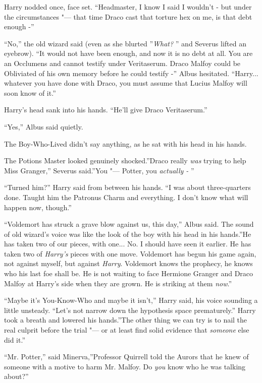 Harry nodded once, face set. ``Headmaster, I know I said I wouldn't -
but under the circumstances "--- that time Draco cast that torture hex on
me, is that debt enough -''

``No,'' the old wizard said (even as she blurted ''\emph{What?} '' and
Severus lifted an eyebrow). ``It would not have been enough, and now it
is no debt at all. You are an Occlumens and cannot testify under
Veritaserum. Draco Malfoy could be Obliviated of his own memory before
he could testify -'' Albus hesitated. ``Harry... whatever you have
done with Draco, you must assume that Lucius Malfoy will soon know of
it.''

Harry's head sank into his hands. ``He'll give Draco Veritaserum.''

``Yes,'' Albus said quietly.

The Boy-Who-Lived didn't say anything, as he sat with his head in his
hands.

The Potions Master looked genuinely shocked.''Draco really \emph{was}
trying to help Miss Granger,'' Severus said.''You "--- Potter, you
\emph{actually -} ''

``Turned him?'' Harry said from between his hands. ``I was about
three-quarters done. Taught him the Patronus Charm and everything. I
don't know what will happen now, though.''

``Voldemort has struck a grave blow against us, this day,'' Albus said.
The sound of old wizard's voice was like the look of the boy with his
head in his hands.''He has taken two of our pieces, with one... No.
I should have seen it earlier. He has taken two of \emph{Harry's} pieces
with one move. Voldemort has begun his game again, not against myself,
but against \emph{Harry}. Voldemort knows the prophecy, he knows who his
last foe shall be. He is not waiting to face Hermione Granger and Draco
Malfoy at Harry's side when they are grown. He is striking at them
\emph{now}.''

``Maybe it's You-Know-Who and maybe it isn't,'' Harry said, his voice
sounding a little unsteady. ``Let's not narrow down the hypothesis space
prematurely.'' Harry took a breath and lowered his hands.''The other
thing we can try is to nail the real culprit before the trial "--- or at
least find solid evidence that \emph{someone} else did it.''

``Mr. Potter,'' said Minerva,''Professor Quirrell told the Aurors that
he knew of someone with a motive to harm Mr. Malfoy. Do \emph{you} know
who he was talking about?''

